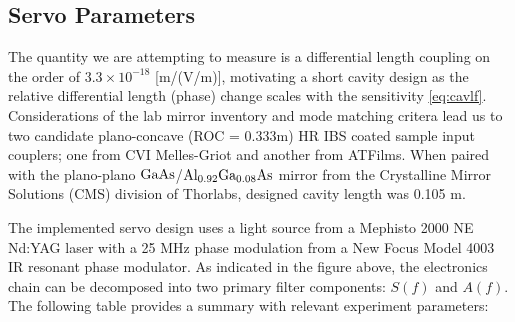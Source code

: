 \subsection{Servo Parameters}
The quantity we are attempting to measure is a differential length coupling on the order of $3.3 \times 10^{-18}$ [m/(V/m)], motivating a short cavity design as the relative differential length (phase) change scales with the sensitivity \autoref{eq:cavlf}. Considerations of the lab mirror inventory and mode matching critera lead us to two candidate plano-concave (ROC = 0.333m) HR IBS coated sample input couplers; one from CVI Melles-Griot and another from ATFilms. When paired with the plano-plano $\mathrm{GaAs}$/$\mathrm{Al_{0.92}Ga_{0.08}As}$  mirror from the Crystalline Mirror Solutions (CMS) division of Thorlabs, designed cavity length was 0.105 m.


The implemented servo design uses a light source from a Mephisto 2000 NE Nd:YAG laser with a 25 MHz phase modulation from a New Focus Model 4003 IR resonant phase modulator. As indicated in the figure above, the electronics chain can be decomposed into two primary filter components: $S(f)$ and $A(f)$. The following table provides a summary with relevant experiment parameters:

